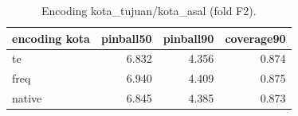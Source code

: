 \begin{table}[ht]
\centering\small
\begin{tabular}{lrrr}
\toprule
encoding kota & pinball50 & pinball90 & coverage90 \\
\midrule
te & 6.832 & 4.356 & 0.874 \\
freq & 6.940 & 4.409 & 0.875 \\
native & 6.845 & 4.385 & 0.873 \\
\bottomrule
\end{tabular}
\caption{Encoding kota\_tujuan/kota\_asal (fold F2).}
\label{tab:t1_encoding}
\end{table}
